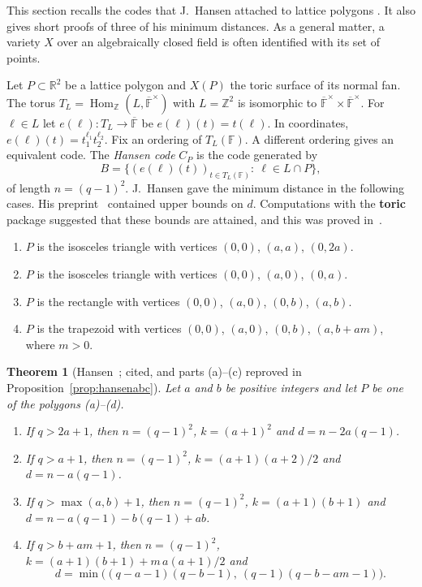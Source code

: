 \documentclass[12pt,letterpaper]{article}
\numberwithin{equation}{section}
\newtheorem{theorem}{Theorem}[section]
\theoremstyle{definition}
\theoremstyle{remark}
\DeclareMathOperator{\Hom}{Hom}
\newcommand{\F}{\mathbb{F}}
\newcommand{\Z}{\mathbb{Z}}
\newcommand{\R}{\mathbb{R}}
\begin{document}
This section recalls the codes that J.~Hansen attached to lattice polygons
\cite{Ha00}. It also gives short proofs of three of his minimum distances.
As a general matter, a variety $X$ over an algebraically closed field is often
identified with its set of points.

Let $P\subset\R^2$ be a lattice polygon and $X(P)$ the toric surface of its
normal fan. The torus $T_L=\Hom_\Z(L,\overline{\F}^\times)$ with $L=\Z^2$ is
isomorphic to $\overline{\F}^\times\times\overline{\F}^\times$. For $\ell\in L$
let $e(\ell):T_L\to\overline{\F}$ be $e(\ell)(t)=t(\ell)$. In coordinates,
$e(\ell)(t)=t_1^{\ell_1}t_2^{\ell_2}$. Fix an ordering of $T_L(\F)$. A
different ordering gives an equivalent code. The \emph{Hansen code} $C_P$ is
the code generated by
\begin{equation}\label{eqn:code}
B=\{(e(\ell)(t))_{t\in T_L(\F)}:\ \ell\in L\cap P\},
\end{equation}
of length $n=(q-1)^2$. J.~Hansen gave the minimum distance in the following
cases. His preprint~\cite{Ha00} contained upper bounds on $d$. Computations
with the \textbf{toric} package suggested that these bounds are attained,
and this was proved in~\cite{Ha02}.
\begin{enumerate}[label=(\alph*)]
\item $P$ is the isosceles triangle with vertices $(0,0)$, $(a,a)$, $(0,2a)$.
\item $P$ is the isosceles triangle with vertices $(0,0)$, $(a,0)$, $(0,a)$.
\item $P$ is the rectangle with vertices $(0,0)$, $(a,0)$, $(0,b)$, $(a,b)$.
\item $P$ is the trapezoid with vertices $(0,0)$, $(a,0)$, $(0,b)$,
$(a,b+am)$, where $m>0$.
\end{enumerate}

\begin{theorem}[Hansen~\cite{Ha02}; cited, and parts (a)--(c) reproved in
Proposition~\ref{prop:hansenabc}]\label{thrm:hansen}
Let $a$ and $b$ be positive integers and let $P$ be one of the polygons
(a)--(d).
\begin{enumerate}[label=(\alph*)]
\item If $q>2a+1$, then $n=(q-1)^2$, $k=(a+1)^2$ and $d=n-2a(q-1)$.
\item If $q>a+1$, then $n=(q-1)^2$, $k=(a+1)(a+2)/2$ and $d=n-a(q-1)$.
\item If $q>\max(a,b)+1$, then $n=(q-1)^2$, $k=(a+1)(b+1)$ and
$d=n-a(q-1)-b(q-1)+ab$.
\item If $q>b+am+1$, then $n=(q-1)^2$, $k=(a+1)(b+1)+m\,a(a+1)/2$ and
\[
d=\min\bigl((q-a-1)(q-b-1),\ (q-1)(q-b-am-1)\bigr).
\]
\end{enumerate}
\end{theorem}
\end{document}
